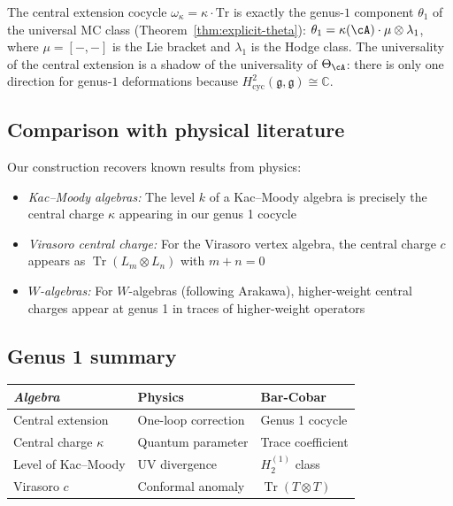 \begin{remark}
\label{rem:central-ext-theta1}
The central extension cocycle $\omega_\kappa = \kappa \cdot
\mathrm{Tr}$ is exactly the genus-$1$ component $\theta_1$ of
the universal MC class (Theorem~\ref{thm:explicit-theta}):
$\theta_1 = \kappa(\cA) \cdot \mu \otimes \lambda_1$,
where $\mu = [-,-]$ is the Lie bracket and $\lambda_1$ is the
Hodge class.  The universality of the central extension is a
shadow of the universality of $\Theta_{\cA}$: there is only one
direction for genus-$1$ deformations because
$H^2_{\mathrm{cyc}}(\mathfrak{g},\mathfrak{g}) \cong \mathbb{C}$.
\end{remark}

\subsection{Comparison with physical literature}

Our construction recovers known results from physics:

\begin{itemize}
\item \emph{Kac--Moody algebras:} The level $k$ of a Kac--Moody algebra is precisely
the central charge $\kappa$ appearing in our genus 1 cocycle

\item \emph{Virasoro central charge:} For the Virasoro vertex algebra, the central
charge $c$ appears as $\operatorname{Tr}(L_m \otimes L_n)$ with $m+n = 0$

\item \emph{$W$-algebras:} For $W$-algebras (following Arakawa), higher-weight
central charges appear at genus 1 in traces of higher-weight operators
\end{itemize}

\subsection{Genus 1 summary}

\begin{center}
\begin{tabular}{|l|l|l|}
\hline
\emph{Algebra} & \textbf{Physics} & \textbf{Bar-Cobar} \\
\hline
Central extension & One-loop correction & Genus 1 cocycle \\
Central charge $\kappa$ & Quantum parameter & Trace coefficient \\
Level of Kac--Moody & UV divergence & $H_2^{(1)}$ class \\
Virasoro $c$ & Conformal anomaly & $\operatorname{Tr}(T \otimes T)$ \\
\hline
\end{tabular}
\end{center}

